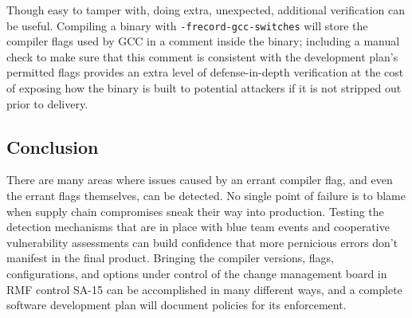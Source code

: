 Though easy to tamper with, doing extra, unexpected, additional verification can be useful. Compiling a binary with \texttt{-frecord-gcc-switches} will store the compiler flags used by GCC in a comment inside the binary; including a manual check to make sure that this comment is consistent with the development plan's permitted flags provides an extra level of defense-in-depth verification at the cost of exposing how the binary is built to potential attackers if it is not stripped out prior to delivery.

\subsection*{Conclusion}
There are many areas where issues caused by an errant compiler flag, and even the errant flags themselves, can be detected. No single point of failure is to blame when supply chain compromises sneak their way into production. Testing the detection mechanisms that are in place with blue team events and cooperative vulnerability assessments can build confidence that more pernicious errors don't manifest in the final product. Bringing the compiler versions, flags, configurations, and options under control of the change management board in RMF control SA-15 can be accomplished in many different ways, and a complete software development plan will document policies for its enforcement.
